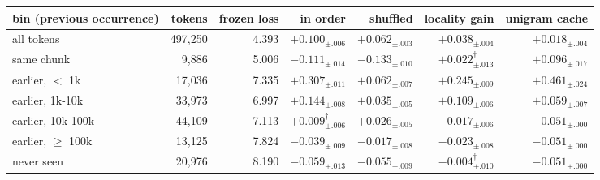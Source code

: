 \begin{tabular}{lrrrrrr}
\toprule
bin (previous occurrence) & tokens & frozen loss & in order & shuffled & locality gain & unigram cache \\
\midrule
all tokens & 497,250 & 4.393 & $+0.100_{\pm .006}$ & $+0.062_{\pm .003}$ & $+0.038_{\pm .004}$ & $+0.018_{\pm .004}$ \\
same chunk & 9,886 & 5.006 & $-0.111_{\pm .014}$ & $-0.133_{\pm .010}$ & $+0.022_{\pm .013}^{\dagger}$ & $+0.096_{\pm .017}$ \\
earlier, $<$ 1k & 17,036 & 7.335 & $+0.307_{\pm .011}$ & $+0.062_{\pm .007}$ & $+0.245_{\pm .009}$ & $+0.461_{\pm .024}$ \\
earlier, 1k-10k & 33,973 & 6.997 & $+0.144_{\pm .008}$ & $+0.035_{\pm .005}$ & $+0.109_{\pm .006}$ & $+0.059_{\pm .007}$ \\
earlier, 10k-100k & 44,109 & 7.113 & $+0.009_{\pm .006}^{\dagger}$ & $+0.026_{\pm .005}$ & $-0.017_{\pm .006}$ & $-0.051_{\pm .000}$ \\
earlier, $\geq$ 100k & 13,125 & 7.824 & $-0.039_{\pm .009}$ & $-0.017_{\pm .008}$ & $-0.023_{\pm .008}$ & $-0.051_{\pm .000}$ \\
never seen & 20,976 & 8.190 & $-0.059_{\pm .013}$ & $-0.055_{\pm .009}$ & $-0.004_{\pm .010}^{\dagger}$ & $-0.051_{\pm .000}$ \\
\bottomrule
\end{tabular}

